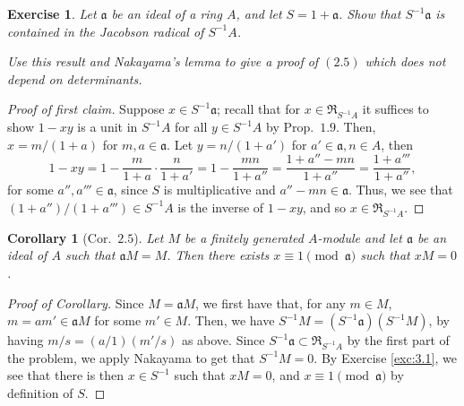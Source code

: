 \documentclass[12pt,letterpaper]{article}
\newtheorem{problem}{Exercise}[section]
\newtheorem*{corollary}{Corollary}
\theoremstyle{definition}
\theoremstyle{remark}
\numberwithin{figure}{problem}
\numberwithin{equation}{section}
\begin{document}
\begin{problem}
  Let $\mathfrak{a}$ be an ideal of a ring $A$, and let $S = 1 + \mathfrak{a}$. Show that $S^{-1}\mathfrak{a}$ is contained in the Jacobson radical of $S^{-1}A$.
  \par Use this result and Nakayama's lemma to give a proof of $(2.5)$ which does not depend on determinants.
\end{problem}
\begin{proof}[Proof of first claim]
  Suppose $x \in S^{-1}\mathfrak{a}$; recall that for $x \in
  \mathfrak{R}_{S^{-1}A}$ it suffices to show $1-xy$ is a unit in $S^{-1}A$ for
  all $y \in S^{-1}A$ by Prop.~$1.9$. Then, $x = m/(1+a)$ for $m,a \in \mathfrak{a}$. Let $y = n/(1+a')$ for $a' \in \mathfrak{a},n \in A$, then
  \begin{equation*}
    1 - xy = 1 - \frac{m}{1+a} \cdot \frac{n}{1+a'} = 1 - \frac{mn}{1+a''} = \frac{1 + a''-mn}{1+a''} = \frac{1 + a'''}{1+a''},
  \end{equation*}
  for some $a'',a''' \in \mathfrak{a}$, since $S$ is multiplicative and $a''-mn \in \mathfrak{a}$. Thus, we see that $(1+a'')/(1+a''') \in S^{-1}A$ is the inverse of $1-xy$, and so $x \in \mathfrak{R}_{S^{-1}A}$.
\end{proof}
\begin{corollary}[Cor.~$2.5$]
  Let $M$ be a finitely generated $A$-module and let $\mathfrak{a}$ be an ideal of $A$ such that $\mathfrak{a}M = M$. Then there exists $x \equiv 1\pmod{\mathfrak{a}}$ such that $xM = 0$.
\end{corollary}
\begin{proof}[Proof of Corollary]
  Since $M = \mathfrak{a}M$, we first have that, for any $m \in M$, $m = am' \in
  \mathfrak{a}M$ for some $m' \in M$. Then, we have $S^{-1}M =
  (S^{-1}\mathfrak{a})(S^{-1}M)$, by having $m/s = (a/1)(m'/s)$ as above. Since
  $S^{-1}\mathfrak{a} \subset \mathfrak{R}_{S^{-1}A}$ by the first part of the
  problem, we apply Nakayama to get that $S^{-1}M = 0$. By Exercise
  \ref{exc:3.1}, we see that there is then $x \in S^{-1}$ such that $xM = 0$, and $x \equiv 1 \pmod{\mathfrak{a}}$ by definition of $S$.
\end{proof}
\end{document}
